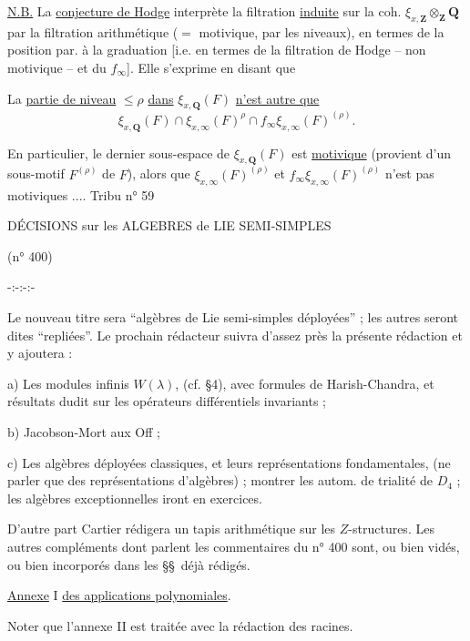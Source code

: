 \uline{N.B.} La \uline{conjecture de Hodge} interprète la filtration \uline{induite} sur la coh.  $\xi_{x,\mathbf Z}\otimes_{\mathbf Z}\mathbf Q$  par la filtration arithmétique ($=$ motivique, par les niveaux), en termes de la position par. à la graduation [i.e. en termes de la filtration de Hodge -- non motivique -- et du $f_\infty$]. Elle s'exprime en disant que


La \uline{partie de niveau} $\leq\rho$ \uline{dans} $\xi_{x,\mathbf Q}(F)$ \uline{n'est autre que}
\[
\xi_{x,\mathbf Q}(F)\cap\xi_{x,\infty}(F)^\rho\cap f_\infty\xi_{x,\infty}(F)^{(\rho)}.
\]

En particulier, le dernier sous-espace de $\xi_{x,\mathbf Q}(F)$ est \uline{motivique} (provient d'un sous-motif $F^{(\rho)}$ de $F$), alors que $\xi_{x,\infty}(F)^{(\rho)}$ et $f_\infty\xi_{x,\infty}(F)^{(\rho)}$ n'est pas motiviques .... 
\hfill Tribu n° 59

DÉCISIONS sur les ALGEBRES de LIE SEMI-SIMPLES

(n° 400)

\centerline{-:-:-:-}

Le nouveau titre sera ``algèbres de Lie semi-simples déployées'' ; les autres seront dites ``repliées''. Le prochain rédacteur suivra d'assez près la présente rédaction et y ajoutera :

a) Les modules infinis $W(\lambda)$, (cf. \S 4), avec formules de Harish-Chandra, et résultats dudit sur les opérateurs différentiels invariants ;

b) Jacobson-Mort aux Off ;

c) Les algèbres déployées classiques, et leurs représentations fondamentales, (ne parler que des représentations d'algèbres) ; montrer les autom. de trialité de $D_4$ ; les algèbres exceptionnelles iront en exercices.

D'autre part Cartier rédigera un tapis arithmétique sur les $Z$-structures. Les autres compléments dont parlent les commentaires du n° 400 sont, ou bien vidés, ou bien incorporés dans les \S\S\ déjà rédigés.

\uline{Annexe} I \uline{des applications polynomiales}.

Noter que l'annexe II est traitée avec la rédaction des racines.

